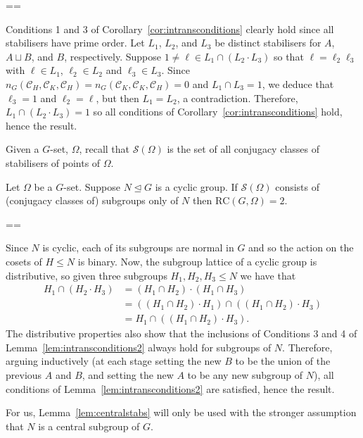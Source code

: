 \documentclass[11pt, a4paper]{amsart}
\makeatletter
\newcommand\C{\mathcal{C}}
\renewcommand{\proofname}{Proof}
\renewenvironment{proof}[1][\proofname]{\par
  \pushQED{\qed}  \normalfont \partopsep=\z@skip \topsep=\z@skip
  \trivlist
  \item[\hskip\labelsep
        \scshape
    #1\@addpunct{.}]\ignorespaces
}{  \popQED\endtrivlist\@endpefalse
}
\makeatother
\begin{document}
\begin{proof}
 Conditions 1 and 3 of Corollary~\ref{cor:intransconditions} clearly hold since all stabilisers have prime order. Let $L_1$, $L_2$, and $L_3$ be distinct stabilisers for $A$, $A\sqcup B$, and $B$, respectively. Suppose $1\ne \ell\in L_1\cap(L_2\cdot L_3)$ so that $\ell=\ell_2\ell_3$ with $\ell\in L_1$, $\ell_2\in L_2$ and $\ell_3\in L_3$. Since $n_G(\mathcal{C}_H,\C_K,\C_H)=n_G(\mathcal{C}_K,\C_K,\C_H)=0$ and $L_1\cap L_3=1$, we deduce that $\ell_3=1$ and $\ell_2=\ell$, but then $L_1=L_2$, a contradiction. Therefore, $L_1\cap(L_2\cdot L_3)=1$ so all conditions of Corollary~\ref{cor:intransconditions} hold, hence the result.
\end{proof}

                  Given a $G$-set, $\Omega$, recall that $\mathcal{S}(\Omega)$ is the set of all conjugacy classes of stabilisers of points of $\Omega$.
\begin{lemma}\label{lem:centralstabs}
    Let $\Omega$ be a $G$-set. Suppose $N\trianglelefteq G$ is a cyclic group. If $\mathcal{S}(\Omega)$ consists of (conjugacy classes of) subgroups only of $N$ then $\mathrm{RC}(G,\Omega)=2$.
\end{lemma}
\begin{proof}
    Since $N$ is cyclic, each of its subgroups are normal in $G$ and so the action on the cosets of $H\leq N$ is binary. Now, the subgroup lattice of a cyclic group is distributive, so given three subgroups $H_1,H_2,H_3\leq N$ we have that \begin{align*}H_1\cap(H_2\cdot H_3)&=(H_1\cap H_2)\cdot(H_1\cap H_3)\\&=((H_1\cap H_2)\cdot H_1)\cap((H_1\cap H_2)\cdot H_3)\\&=H_1\cap ((H_1\cap H_2)\cdot H_3).\end{align*} The distributive properties also show that the inclusions of Conditions 3 and 4 of Lemma~\ref{lem:intransconditions2} always hold for subgroups of $N$. Therefore, arguing inductively (at each stage setting the new $B$ to be the union of the previous $A$ and $B$, and setting the new $A$ to be any new subgroup of $N$), all conditions of Lemma~\ref{lem:intransconditions2} are satisfied, hence the result.
                    \end{proof}
\begin{rk}
For us, Lemma~\ref{lem:centralstabs} will only be used with the stronger assumption that $N$ is a central subgroup of $G$.
\end{rk}
\end{document}
